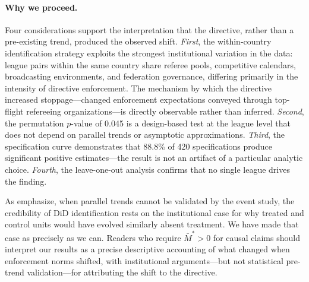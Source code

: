 \paragraph{Why we proceed.} Four considerations support the interpretation that the directive, rather than a pre-existing trend, produced the observed shift. \textit{First}, the within-country identification strategy exploits the strongest institutional variation in the data: league pairs within the same country share referee pools, competitive calendars, broadcasting environments, and federation governance, differing primarily in the intensity of directive enforcement. The mechanism by which the directive increased stoppage---changed enforcement expectations conveyed through top-flight refereeing organizations---is directly observable rather than inferred. \textit{Second}, the permutation $p$-value of 0.045 is a design-based test at the league level that does not depend on parallel trends or asymptotic approximations. \textit{Third}, the specification curve demonstrates that 88.8\% of 420 specifications produce significant positive estimates---the result is not an artifact of a particular analytic choice. \textit{Fourth}, the leave-one-out analysis confirms that no single league drives the finding.

As \citet{roth2022pretest} emphasize, when parallel trends cannot be validated by the event study, the credibility of DiD identification rests on the institutional case for why treated and control units would have evolved similarly absent treatment. We have made that case as precisely as we can. Readers who require $\bar{M}^* > 0$ for causal claims should interpret our results as a precise descriptive accounting of what changed when enforcement norms shifted, with institutional arguments---but not statistical pre-trend validation---for attributing the shift to the directive.

